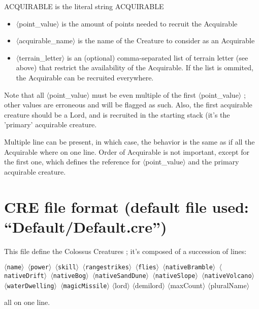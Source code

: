 \documentclass{article}
\begin{document}
ACQUIRABLE is the literal string ACQUIRABLE

\begin{itemize}
\item $\langle$point\_value$\rangle$ is the amount of points needed to recruit the Acquirable
\item $\langle$acquirable\_name$\rangle$ is the name of the Creature to consider as an Acquirable
\item $\langle$terrain\_letter$\rangle$ is an (optional) comma-separated list of terrain letter (see above) that restrict the availability of the Acquirable. If the list is ommited, the Acquirable can be recruited everywhere.
\end{itemize}

Note that all $\langle$point\_value$\rangle$ must be even multiple of the first
$\langle$point\_value$\rangle$ ; other values are erroneous and will be flagged
as such. Also, the first acquirable creature should be a Lord,
and is recruited in the starting stack (it's the 'primary'
acquirable creature.

Multiple line can be present, in which case, the behavior is
the same as if all the Acquirable where on one line. Order of
Acquirable is not important, except for the first one, which
defines the reference for $\langle$point\_value$\rangle$ and the primary
acquirable creature.

\section{CRE file format (default file used: ``Default/Default.cre'')}

This file define the Colossus Creatures ; it's composed
of a succession of lines:

\texttt{$\langle$name$\rangle$ $\langle$power$\rangle$ $\langle$skill$\rangle$
$\langle$rangestrikes$\rangle$ $\langle$flies$\rangle$
$\langle$nativeBramble$\rangle$ $\langle$nativeDrift$\rangle$ $\langle$nativeBog$\rangle$ $\langle$nativeSandDune$\rangle$ $\langle$nativeSlope$\rangle$
$\langle$nativeVolcano$\rangle$ $\langle$waterDwelling$\rangle$ $\langle$magicMissile$\rangle$}
$\langle$lord$\rangle$ $\langle$demilord$\rangle$
$\langle$maxCount$\rangle$
$\langle$pluralName$\rangle$

all on one line.
\end{document}
